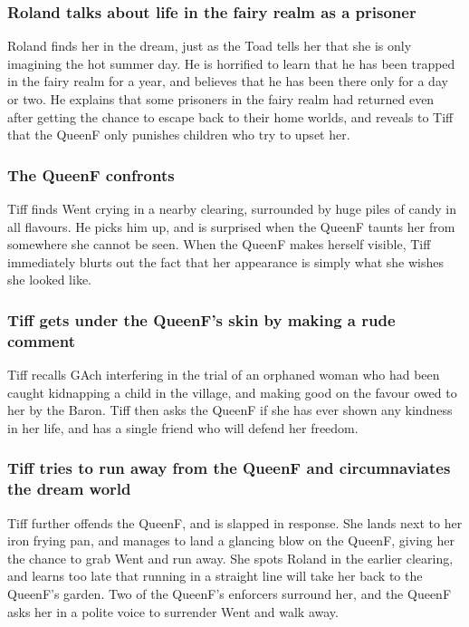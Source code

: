 \subsubsection{\Gls{Roland} talks about life in the fairy realm as a prisoner}
\Gls{Roland} finds her in the dream, just as the \Gls{Toad} tells her that she is only imagining the
hot summer day. He is horrified to learn that he has been trapped in the fairy realm for a year, and
believes that he has been there only for a day or two. He explains that some prisoners in the fairy
realm had returned even after getting the chance to escape back to their home worlds, and reveals
to \Gls{Tiff} that the \Gls{QueenF} only punishes children who try to upset her.

\subsubsection{The \Gls{QueenF} confronts }
\Gls{Tiff} finds \Gls{Went} crying in a nearby clearing, surrounded by huge piles of candy in all
flavours. He picks him up, and is surprised when the \Gls{QueenF} taunts her from somewhere she
cannot be seen. When the \Gls{QueenF} makes herself visible, \Gls{Tiff} immediately blurts out the
fact that her appearance is simply what she wishes she looked like.

\subsubsection{\Gls{Tiff} gets under the \Gls{QueenF}'s skin by making a rude comment}
\Gls{Tiff} recalls \Gls{GAch} interfering in the trial of an orphaned woman who had been caught
kidnapping a child in the village, and making good on the favour owed to her by the \Gls{Baron}.
\Gls{Tiff} then asks the \Gls{QueenF} if she has ever shown any kindness in her life, and has a
single friend who will defend her freedom.

\subsubsection{\Gls{Tiff} tries to run away from the \Gls{QueenF} and circumnaviates the dream
    world}
\Gls{Tiff} further offends the \Gls{QueenF}, and is slapped in response. She lands next to her iron
frying pan, and manages to land a glancing blow on the \Gls{QueenF}, giving her the chance to grab
\Gls{Went} and run away. She spots \Gls{Roland} in the earlier clearing, and learns too late that
running in a straight line will take her back to the \Gls{QueenF}'s garden. Two of the
\Gls{QueenF}'s enforcers surround her, and the \Gls{QueenF} asks her in a polite voice to surrender
\Gls{Went} and walk away.

